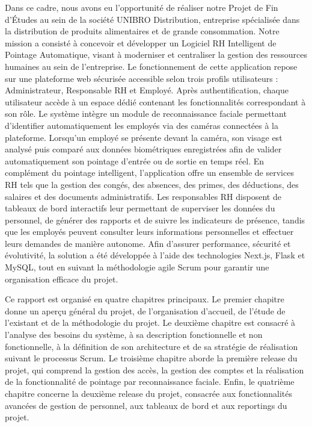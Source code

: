 Dans ce cadre, nous avons eu l’opportunité de réaliser notre Projet de Fin d’Études au sein de la société UNIBRO Distribution, entreprise spécialisée dans la distribution de produits alimentaires et de grande consommation. Notre mission a consisté à concevoir et développer un Logiciel RH Intelligent de Pointage Automatique, visant à moderniser et centraliser la gestion des ressources humaines au sein de l’entreprise. Le fonctionnement de cette application repose sur une plateforme web sécurisée accessible selon trois profils utilisateurs : Administrateur, Responsable RH et Employé. Après authentification, chaque utilisateur accède à un espace dédié contenant les fonctionnalités correspondant à son rôle. Le système intègre un module de reconnaissance faciale permettant d’identifier automatiquement les employés via des caméras connectées à la plateforme. Lorsqu’un employé se présente devant la caméra, son visage est analysé puis comparé aux données biométriques enregistrées afin de valider automatiquement son pointage d’entrée ou de sortie en temps réel. En complément du pointage intelligent, l’application offre un ensemble de services RH tels que la gestion des congés, des absences, des primes, des déductions, des salaires et des documents administratifs. Les responsables RH disposent de tableaux de bord interactifs leur permettant de superviser les données du personnel, de générer des rapports et de suivre les indicateurs de présence, tandis que les employés peuvent consulter leurs informations personnelles et effectuer leurs demandes de manière autonome. Afin d’assurer performance, sécurité et évolutivité, la solution a été développée à l’aide des technologies Next.js, Flask et MySQL, tout en suivant la méthodologie agile Scrum pour garantir une organisation efficace du projet.

Ce rapport est organisé en quatre chapitres principaux. Le premier chapitre donne un aperçu général du projet, de l’organisation d’accueil, de l’étude de l’existant et de la méthodologie du projet. Le deuxième chapitre est consacré à l’analyse des besoins du système, à sa description fonctionnelle et non fonctionnelle, à la définition de son architecture et de sa stratégie de réalisation suivant le processus Scrum. Le troisième chapitre aborde la première release du projet, qui comprend la gestion des accès, la gestion des comptes et la réalisation de la fonctionnalité de pointage par reconnaissance faciale. Enfin, le quatrième chapitre concerne la deuxième release du projet, consacrée aux fonctionnalités avancées de gestion de personnel, aux tableaux de bord et aux reportings du projet.
\clearpage
\mtcaddchapter